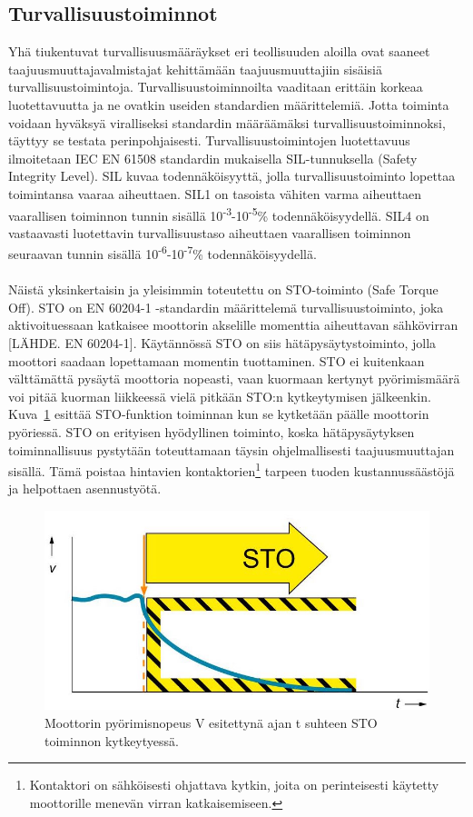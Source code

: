 \documentclass[finnish,12pt,a4paper,pdftex,elec,utf8]{aaltothesis}
\begin{document}
\subsection{Turvallisuustoiminnot}
Yhä tiukentuvat turvallisuusmääräykset eri teollisuuden aloilla ovat saaneet taajuusmuuttajavalmistajat kehittämään taajuusmuuttajiin sisäisiä turvallisuustoimintoja. Turvallisuustoiminnoilta vaaditaan erittäin korkeaa luotettavuutta ja ne ovatkin useiden standardien määrittelemiä. Jotta toiminta voidaan hyväksyä viralliseksi standardin määräämäksi turvallisuustoiminnoksi, täyttyy se testata perinpohjaisesti. Turvallisuustoimintojen luotettavuus ilmoitetaan IEC EN 61508 standardin mukaisella SIL-tunnuksella (Safety Integrity Level). SIL kuvaa todennäköisyyttä, jolla turvallisuustoiminto lopettaa toimintansa vaaraa aiheuttaen. SIL1 on tasoista vähiten varma aiheuttaen vaarallisen toiminnon tunnin sisällä 10\textsuperscript{-3}-10\textsuperscript{-5}\% todennäköisyydellä. SIL4 on vastaavasti luotettavin turvallisuustaso aiheuttaen vaarallisen toiminnon seuraavan tunnin sisällä 10\textsuperscript{-6}-10\textsuperscript{-7}\% todennäköisyydellä. \cite{IEC61508}
\\\\
Näistä yksinkertaisin ja yleisimmin toteutettu on STO-toiminto (Safe Torque Off). STO on EN 60204-1 -standardin määrittelemä turvallisuustoiminto, joka aktivoituessaan katkaisee moottorin akselille momenttia aiheuttavan sähkövirran [LÄHDE. EN 60204-1]. Käytännössä STO on siis hätäpysäytystoiminto, jolla moottori saadaan lopettamaan momentin tuottaminen. STO ei kuitenkaan välttämättä pysäytä moottoria nopeasti, vaan kuormaan kertynyt pyörimismäärä voi pitää kuorman liikkeessä vielä pitkään STO:n kytkeytymisen jälkeenkin. Kuva~\ref{fig:STO} esittää STO-funktion toiminnan kun se kytketään päälle moottorin pyöriessä. STO on erityisen hyödyllinen toiminto, koska hätäpysäytyksen toiminnallisuus pystytään toteuttamaan täysin ohjelmallisesti taajuusmuuttajan sisällä. Tämä poistaa hintavien kontaktorien\footnote{Kontaktori on sähköisesti ohjattava kytkin, joita on perinteisesti käytetty moottorille menevän virran katkaisemiseen.} tarpeen tuoden kustannussäästöjä ja helpottaen asennustyötä.
\begin{figure}[H]
	\begin{center}
	\includegraphics[scale=0.5]{STO}
	\end{center}
	\caption{Moottorin pyörimisnopeus V esitettynä ajan t suhteen STO toiminnon kytkeytyessä.
		 \cite{STOkuva}}
	\label{fig:STO}
\end{figure}
\end{document}
